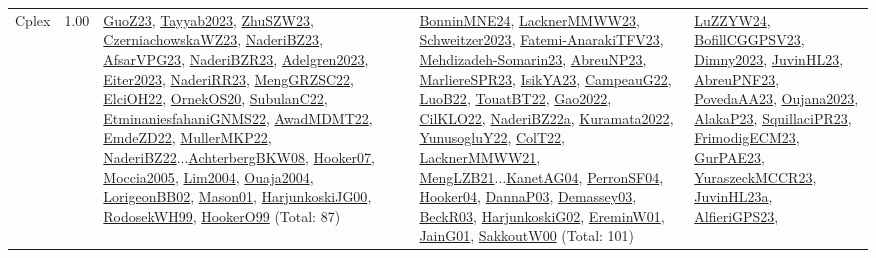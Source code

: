 {\begin{longtable}{p{3cm}r>{\raggedright\arraybackslash}p{6cm}>{\raggedright\arraybackslash}p{6cm}>{\raggedright\arraybackslash}p{8cm}}
\index{Cplex}\index{CPSystems!Cplex}Cplex &  1.00 & \hyperref[detail:GuoZ23]{GuoZ23}, \hyperref[detail:Tayyab2023]{Tayyab2023}, \hyperref[detail:ZhuSZW23]{ZhuSZW23}, \hyperref[detail:CzerniachowskaWZ23]{CzerniachowskaWZ23}, \hyperref[detail:NaderiBZ23]{NaderiBZ23}, \hyperref[detail:AfsarVPG23]{AfsarVPG23}, \hyperref[detail:NaderiBZR23]{NaderiBZR23}, \hyperref[detail:Adelgren2023]{Adelgren2023}, \hyperref[detail:Eiter2023]{Eiter2023}, \hyperref[detail:NaderiRR23]{NaderiRR23}, \hyperref[detail:MengGRZSC22]{MengGRZSC22}, \hyperref[detail:ElciOH22]{ElciOH22}, \hyperref[detail:OrnekOS20]{OrnekOS20}, \hyperref[detail:SubulanC22]{SubulanC22}, \hyperref[detail:EtminaniesfahaniGNMS22]{EtminaniesfahaniGNMS22}, \hyperref[detail:AwadMDMT22]{AwadMDMT22}, \hyperref[detail:EmdeZD22]{EmdeZD22}, \hyperref[detail:MullerMKP22]{MullerMKP22}, \hyperref[detail:NaderiBZ22]{NaderiBZ22}...\hyperref[detail:AchterbergBKW08]{AchterbergBKW08}, \hyperref[detail:Hooker07]{Hooker07}, \hyperref[detail:Moccia2005]{Moccia2005}, \hyperref[detail:Lim2004]{Lim2004}, \hyperref[detail:Ouaja2004]{Ouaja2004}, \hyperref[detail:LorigeonBB02]{LorigeonBB02}, \hyperref[detail:Mason01]{Mason01}, \hyperref[detail:HarjunkoskiJG00]{HarjunkoskiJG00}, \hyperref[detail:RodosekWH99]{RodosekWH99}, \hyperref[detail:HookerO99]{HookerO99} (Total: 87) & \hyperref[detail:BonninMNE24]{BonninMNE24}, \hyperref[detail:LacknerMMWW23]{LacknerMMWW23}, \hyperref[detail:Schweitzer2023]{Schweitzer2023}, \hyperref[detail:Fatemi-AnarakiTFV23]{Fatemi-AnarakiTFV23}, \hyperref[detail:Mehdizadeh-Somarin23]{Mehdizadeh-Somarin23}, \hyperref[detail:AbreuNP23]{AbreuNP23}, \hyperref[detail:MarliereSPR23]{MarliereSPR23}, \hyperref[detail:IsikYA23]{IsikYA23}, \hyperref[detail:CampeauG22]{CampeauG22}, \hyperref[detail:LuoB22]{LuoB22}, \hyperref[detail:TouatBT22]{TouatBT22}, \hyperref[detail:Gao2022]{Gao2022}, \hyperref[detail:CilKLO22]{CilKLO22}, \hyperref[detail:NaderiBZ22a]{NaderiBZ22a}, \hyperref[detail:Kuramata2022]{Kuramata2022}, \hyperref[detail:YunusogluY22]{YunusogluY22}, \hyperref[detail:ColT22]{ColT22}, \hyperref[detail:LacknerMMWW21]{LacknerMMWW21}, \hyperref[detail:MengLZB21]{MengLZB21}...\hyperref[detail:KanetAG04]{KanetAG04}, \hyperref[detail:PerronSF04]{PerronSF04}, \hyperref[detail:Hooker04]{Hooker04}, \hyperref[detail:DannaP03]{DannaP03}, \hyperref[detail:Demassey03]{Demassey03}, \hyperref[detail:BeckR03]{BeckR03}, \hyperref[detail:HarjunkoskiG02]{HarjunkoskiG02}, \hyperref[detail:EreminW01]{EreminW01}, \hyperref[detail:JainG01]{JainG01}, \hyperref[detail:SakkoutW00]{SakkoutW00} (Total: 101) & \hyperref[detail:LuZZYW24]{LuZZYW24}, \hyperref[detail:BofillCGGPSV23]{BofillCGGPSV23}, \hyperref[detail:Dimny2023]{Dimny2023}, \hyperref[detail:JuvinHL23]{JuvinHL23}, \hyperref[detail:AbreuPNF23]{AbreuPNF23}, \hyperref[detail:PovedaAA23]{PovedaAA23}, \hyperref[detail:Oujana2023]{Oujana2023}, \hyperref[detail:AlakaP23]{AlakaP23}, \hyperref[detail:SquillaciPR23]{SquillaciPR23}, \hyperref[detail:FrimodigECM23]{FrimodigECM23}, \hyperref[detail:GurPAE23]{GurPAE23}, \hyperref[detail:YuraszeckMCCR23]{YuraszeckMCCR23}, \hyperref[detail:JuvinHL23a]{JuvinHL23a}, \hyperref[detail:AlfieriGPS23]{AlfieriGPS23}, 
\end{longtable}}
